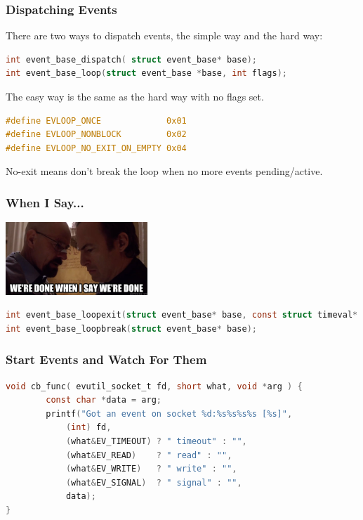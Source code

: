 \begin{frame}[fragile]
\frametitle{Dispatching Events}

There are two ways to dispatch events, the simple way and the hard way:
\begin{lstlisting}[language=C]
int event_base_dispatch( struct event_base* base);
int event_base_loop(struct event_base *base, int flags);
\end{lstlisting}

The easy way is the same as the hard way with no flags set.

\begin{lstlisting}[language=C]
#define EVLOOP_ONCE             0x01
#define EVLOOP_NONBLOCK         0x02
#define EVLOOP_NO_EXIT_ON_EMPTY 0x04
\end{lstlisting}

No-exit means don't break the loop when no more events pending/active.

\end{frame}


\begin{frame}[fragile]
\frametitle{When I Say...}

\begin{center}
	\includegraphics[width=0.4\textwidth]{images/whenisay.jpg}
\end{center}

\begin{lstlisting}[language=C]
int event_base_loopexit(struct event_base* base, const struct timeval* tv);
int event_base_loopbreak(struct event_base* base);
\end{lstlisting}


\end{frame}


\begin{frame}[fragile]
\frametitle{Start Events and Watch For Them}

\begin{lstlisting}[language=C]
void cb_func( evutil_socket_t fd, short what, void *arg ) {
        const char *data = arg;
        printf("Got an event on socket %d:%s%s%s%s [%s]",
            (int) fd,
            (what&EV_TIMEOUT) ? " timeout" : "",
            (what&EV_READ)    ? " read" : "",
            (what&EV_WRITE)   ? " write" : "",
            (what&EV_SIGNAL)  ? " signal" : "",
            data);
}
\end{lstlisting}
\end{frame}

